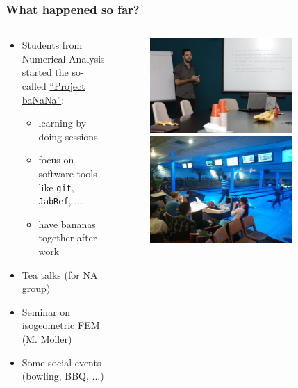 \documentclass{beamer}
\begin{document}
\begin{frame}
\frametitle{What happened so far?}
\begin{columns}
 \begin{column}{0.8\textwidth}
 \begin{itemize}
  \item Students from Numerical Analysis started the so-called \href{http://projectbanana.github.io}{``Project ba{\color{red}NaN}a''}:
  \begin{itemize}
  \item learning-by-doing sessions
  \item focus on software tools like \texttt{git}, \texttt{JabRef}, ...
  \item have bananas together after work
 \end{itemize}
 \item Tea talks (for NA group)
 \item Seminar on isogeometric FEM (M. M\"oller)
 \item Some social events (bowling, BBQ, ...)
 \end{itemize}
 \end{column}

 \begin{column}{0.4\textwidth}
  \begin{figure}[t]
  \centering
  \includegraphics[width=0.8\textwidth]{images/moritz} \vspace{0.6cm}\\
  \includegraphics[width=0.8\textwidth]{images/bowling}
  \end{figure}
 \end{column}
 \end{columns}
\end{frame}
\end{document}
